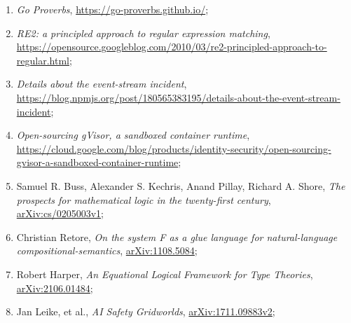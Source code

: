 \documentclass[a4paper,11pt]{article}
\begin{document}
\begin{enumerate}
\item \textit{Go Proverbs},
  \href{https://go-proverbs.github.io/}{https://go-proverbs.github.io/};



\item \textit{RE2: a principled approach to regular expression
    matching}, \\
  \href{https://opensource.googleblog.com/2010/03/re2-principled-approach-to-regular.html}{https://opensource.googleblog.com/2010/03/re2-principled-approach-to-regular.html};



\item \textit{Details about the event-stream incident}, \\
  \href{https://blog.npmjs.org/post/180565383195/details-about-the-event-stream-incident}{https://blog.npmjs.org/post/180565383195/details-about-the-event-stream-incident};



\item \textit{Open-sourcing gVisor, a sandboxed container runtime}, \\
  \href{https://cloud.google.com/blog/products/identity-security/open-sourcing-gvisor-a-sandboxed-container-runtime}{https://cloud.google.com/blog/products/identity-security/open-sourcing-gvisor-a-sandboxed-container-runtime};



\item Samuel R. Buss, Alexander S. Kechris, Anand Pillay, Richard A.
  Shore, \textit{The prospects for mathematical logic in the
    twenty-first century},
  \href{https://arxiv.org/abs/cs/0205003v1}{arXiv:cs/0205003v1};



\item Christian Retore, \textit{On the system F as a glue language for
    natural-language compositional-semantics},
  \href{https://arxiv.org/abs/1108.5084}{arXiv:1108.5084};



\item Robert Harper, \textit{An Equational Logical Framework for Type
    Theories},
  \href{https://arxiv.org/abs/2106.01484}{arXiv:2106.01484};



\item Jan Leike, et al., \textit{AI Safety Gridworlds},
  \href{https://arxiv.org/abs/1711.09883}{arXiv:1711.09883v2};




\end{enumerate}
\end{document}
